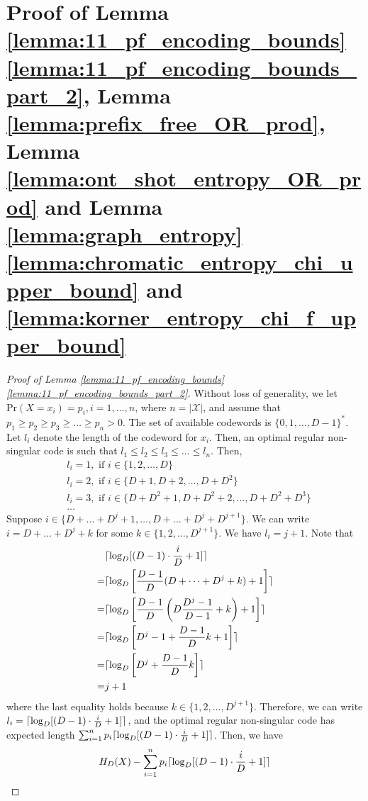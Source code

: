 \documentclass[journal, onecolumn, draftcls]{IEEEtran}
\DeclarePairedDelimiter{\ceil}{\lceil}{\rceil}
\theoremstyle{definition}
\newcommand{\calX}{\mathcal{X}}
\begin{document}
\section{Proof of Lemma \ref{lemma:11_pf_encoding_bounds}  \ref{lemma:11_pf_encoding_bounds_part_2}, Lemma \ref{lemma:prefix_free_OR_prod}, Lemma \ref{lemma:ont_shot_entropy_OR_prod} and Lemma \ref{lemma:graph_entropy}   \ref{lemma:chromatic_entropy_chi_upper_bound} and \ref{lemma:korner_entropy_chi_f_upper_bound}} \label{app:proof_lemma_graph_entropy} 
\begin{proof}[Proof of Lemma \ref{lemma:11_pf_encoding_bounds}  \ref{lemma:11_pf_encoding_bounds_part_2}]
Without loss of generality, we  let $\text{Pr}(X=x_i) = p_i,i=1,\dots,n$, where $n=|\calX|$, and assume that $p_1\ge p_2\ge p_3\ge \dots \ge p_n >0$. The set
of available codewords is $\{0,1,\dots,D-1\}^*$. Let $l_i$ denote the length of the codeword for $x_i$. Then, an optimal regular non-singular code is such that $l_1\le l_2\le l_3\le \dots\le l_n$. Then,
\begin{align*}
    &l_i = 1, \text{ if }i\in \{1,2,\dots, D\}\\
    &l_i = 2, \text{ if }i\in \{D+1,D+2,\dots, D+D^2\}\\
    &l_i = 3, \text{ if }i\in \{D+D^2+1,D+D^2+2,\dots, D+D^2+D^3\}\\
    &\dots
\end{align*}
Suppose  $i\in \{D+\dots+D^j+1, \dots ,D+\dots+D^j+D^{j+1} \}$. We can write $i= D+\dots+D^j+k$ for some $k\in\{1,2,\dots, D^{j+1}\}$. We have $l_i = j+1$. Note that 
\begin{align*}
    &\ceil{\log_D[(D-1)\cdot \frac{i}{D}+1]}\\ 
    =&\ceil{ \log_D \left[\frac{D-1}{D} (D+\dots+D^j+k )+1\right]}\\ 
    =&\ceil{ \log_D \left[\frac{D-1}{D} \left(D \frac{D^j-1}{D-1}+k \right)+1 \right]} \\
    =&\ceil{ \log_D \left[D^j-1+\frac{D-1}{D} k +1 \right]} \\
    =&\ceil{ \log_D \left[D^j +\frac{D-1}{D} k \right]} \\
    =&j+1
\end{align*}
where the last equality holds because $k\in\{1,2,\dots, D^{j+1}\}$. Therefore, we can write $l_i = \ceil{\log_D[(D-1)\cdot \frac{i}{D}+1]}$, and the optimal regular non-singular code has expected length $\sum_{i=1}^n p_i \ceil{\log_D[(D-1)\cdot \frac{i}{D}+1]}$. Then, we have
    \begin{align*}
        &H_D(X) - \sum_{i=1}^n p_i \ceil{\log_D[(D-1)\cdot \frac{i}{D}+1]}\\

\end{align*}
\end{proof}
\end{document}
